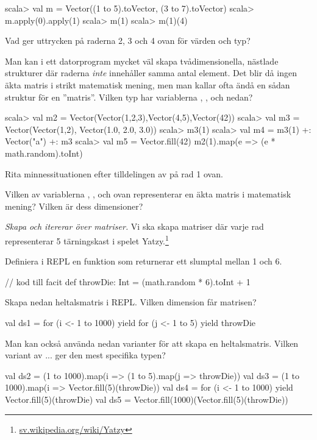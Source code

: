 \begin{REPL}
scala> val m = Vector((1 to 5).toVector, (3 to 7).toVector)
scala> m.apply(0).apply(1)
scala> m(1)
scala> m(1)(4)
\end{REPL}

\Subtask Vad ger uttrycken på raderna 2, 3 och 4 ovan för värden och typ? 

\Subtask Man kan i ett datorprogram mycket väl skapa tvådimensionella, nästlade strukturer där raderna \emph{inte} innehåller samma antal element. Det blir då ingen äkta matris i strikt matematisk mening, men man kallar ofta ändå en sådan struktur för en ''matris''. Vilken typ har variablerna , ,  och  nedan? 

\begin{REPL}
scala> val m2 = Vector(Vector(1,2,3),Vector(4,5),Vector(42))
scala> val m3 = Vector(Vector(1,2), Vector(1.0, 2.0, 3.0))
scala> m3(1)
scala> val m4 = m3(1) +: Vector("a") +: m3
scala> val m5 = Vector.fill(42){ m2(1).map(e => (e * math.random).toInt) }
\end{REPL}

\Subtask\Pen Rita minnessituationen efter tilldelingen av  på rad 1 ovan.

\Subtask\Pen Vilken av variablerna , ,  och  ovan representerar en äkta matris i matematisk mening? Vilken är dess dimensioner?



\Task \emph{Skapa och itererar över matriser.} Vi ska skapa matriser där varje rad representerar 5 tärningskast i spelet Yatzy.\footnote{\href{https://sv.wikipedia.org/wiki/Yatzy}{sv.wikipedia.org/wiki/Yatzy}}


\Subtask Definiera i REPL en funktion  som returnerar ett slumptal mellan 1 och 6.
\begin{Code}
// kod till facit
def throwDie: Int = (math.random * 6).toInt + 1
\end{Code}


\Subtask Skapa nedan heltalsmatris i REPL. Vilken dimension får matrisen?
\begin{REPL}
val ds1 = for (i <- 1 to 1000) yield { 
            for (j <- 1 to 5) yield throwDie 
          }
\end{REPL}

\Subtask Man kan också använda nedan varianter för att skapa en heltalsmatris. Vilken variant av  ...  ger den mest specifika typen?  
\begin{REPL}
val ds2 = (1 to 1000).map(i => (1 to 5).map(j => throwDie))  
val ds3 = (1 to 1000).map(i => Vector.fill(5)(throwDie)) 
val ds4 = for (i <- 1 to 1000) yield Vector.fill(5)(throwDie) 
val ds5 = Vector.fill(1000)(Vector.fill(5)(throwDie))
\end{REPL}

